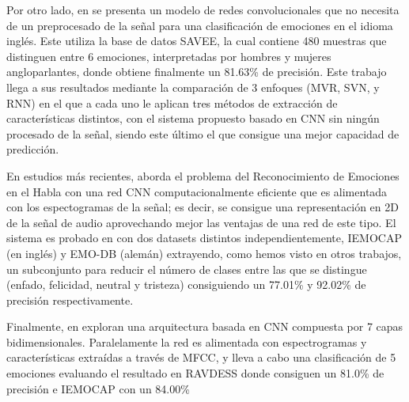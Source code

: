 \documentclass[11pt,a4paper,spanish]{book}
\begin{document}
	Por otro lado, en \cite{AbdulQayyum2019} se presenta un modelo de redes convolucionales que no necesita de un preprocesado de la señal para una clasificación de emociones en el idioma inglés. Este utiliza la base de datos SAVEE, la cual contiene 480 muestras que distinguen entre 6 emociones, interpretadas por hombres y mujeres angloparlantes, donde obtiene finalmente un 81.63\% de precisión. Este trabajo llega a sus resultados mediante la comparación de 3 enfoques (MVR, SVN, y RNN) en el que a cada uno le aplican tres métodos de extracción de características distintos, con el sistema propuesto basado en CNN sin ningún procesado de la señal, siendo este último el que consigue una mejor capacidad de predicción.
	
	En estudios más recientes, \cite{Anvarjon2020} aborda el problema del Reconocimiento de Emociones en el Habla con una red CNN computacionalmente eficiente que es alimentada con los espectogramas de la señal; es decir, se consigue una representación en 2D de la señal de audio aprovechando mejor las ventajas de una red de este tipo. El sistema es probado en con dos datasets distintos independientemente, IEMOCAP (en inglés) y EMO-DB (alemán) extrayendo, como hemos visto en otros trabajos, un subconjunto para reducir el número de clases entre las que se distingue (enfado, felicidad, neutral y tristeza) consiguiendo un 77.01\% y 92.02\%  de precisión respectivamente.

	
	 Finalmente, en \cite{Mustaqeem2020} exploran una arquitectura basada en CNN compuesta por 7 capas bidimensionales. Paralelamente la red es alimentada con espectrogramas y características extraídas a través de MFCC, y lleva a cabo una clasificación de 5 emociones evaluando el resultado en RAVDESS donde consiguen un 81.0\% de precisión e IEMOCAP con un 84.00\%
	
\end{document}
